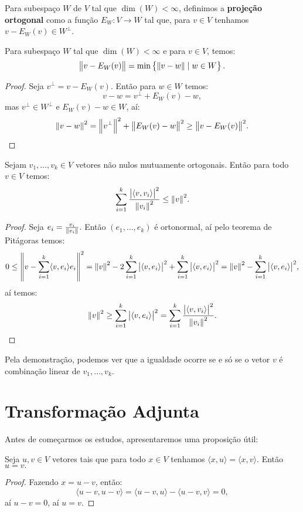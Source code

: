 \documentclass[11pt,twoside,a4paper]{book}
\begin{document}
\begin{definicao}
Para subespaço $W$ de $V$ tal que $\dim(W)<\infty$, definimos a \textbf{projeção ortogonal} como a função $E_W:V\rightarrow W$ tal que, para $v\in V$ tenhamos $v-E_W(v)\in W^\perp$.
\end{definicao}

\begin{proposicao}\label{proj2}
Para subespaço $W$ tal que $\dim(W)<\infty$ e para $v\in V$, temos:
\[
\norm{v-E_W(v)}=\min\left\{\norm{v-w}\mid w\in W\right\}.
\]
\end{proposicao}
\begin{proof}
Seja $v^\perp=v-E_W(v)$. Então para $w\in W$ temos:
\[
v-w=v^\perp+E_W(v)-w,
\]
mas $v^\perp\in W^\perp$ e $E_W(v)-w\in W$, aí:
\[
\norm{v-w}^2=\norm{v^\perp}^2+\norm{E_W(v)-w}^2\geq\norm{v-E_W(v)}^2.
\]
\end{proof}

\begin{teorema}
Sejam $v_1,\dots,v_k\in V$ vetores não nulos mutuamente ortogonais. Então para todo $v\in V$ temos:
\[
\sum_{i=1}^k\frac{\abs{\langle v,v_i\rangle}^2}{\norm{v_i}^2}\leq\norm{v}^2.
\]
\end{teorema}
\begin{proof}
Seja $e_i=\frac{v_i}{\norm{v_i}}.$ Então $(e_1,\dots,e_k)$ é ortonormal, aí pelo teorema de Pitágoras temos:
\[
0\leq\norm{v-\sum_{i=1}^k\langle v,e_i\rangle e_i}^2=\norm{v}^2-2\sum_{i=1}^k\abs{\langle v,e_i\rangle}^2+\sum_{i=1}^k\abs{\langle v,e_i\rangle}^2=\norm{v}^2-\sum_{i=1}^k\abs{\langle v,e_i\rangle}^2,
\]
aí temos:
\[
\norm{v}^2\geq\sum_{i=1}^k\abs{\langle v,e_i\rangle}^2=\sum_{i=1}^k\frac{\abs{\langle v,v_i\rangle}^2}{\norm{v_i}^2}.
\]
\end{proof}

\begin{observacao}
Pela demonstração, podemos ver que a igualdade ocorre se e só se o vetor $v$ é combinação linear de $v_1,\dots,v_k.$
\end{observacao}

\newpage

\section{Transformação Adjunta}

Antes de começarmos os estudos, apresentaremos uma proposição útil:

\begin{proposicao}\label{util}
Seja $u,v\in V$ vetores tais que para todo $x\in V$ tenhamos $\langle x,u\rangle=\langle x,v\rangle.$ Então $u=v.$
\end{proposicao}
\begin{proof}
Fazendo $x=u-v$, então:
\[
\langle u-v,u-v\rangle=\langle u-v,u\rangle-\langle u-v,v\rangle=0,
\]
aí $u-v=0$, aí $u=v.$
\end{proof}
\end{document}
